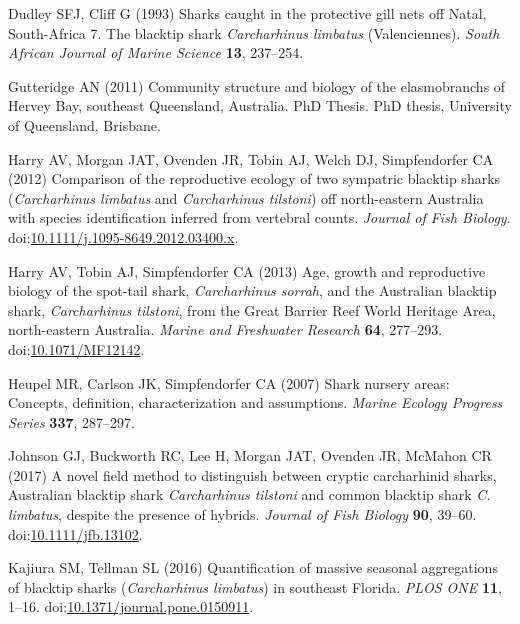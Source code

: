 \documentclass[]{article}
\begin{document}
\leavevmode\hypertarget{ref-dudley_sharks_1993}{}%
Dudley SFJ, Cliff G (1993) Sharks caught in the protective gill nets off
Natal, South-Africa 7. The blacktip shark \emph{Carcharhinus limbatus}
(Valenciennes). \emph{South African Journal of Marine Science}
\textbf{13}, 237--254.

\leavevmode\hypertarget{ref-gutteridge_community_2011}{}%
Gutteridge AN (2011) Community structure and biology of the
elasmobranchs of Hervey Bay, southeast Queensland, Australia. PhD
Thesis. PhD thesis, University of Queensland, Brisbane.

\leavevmode\hypertarget{ref-harry_comparison_2012}{}%
Harry AV, Morgan JAT, Ovenden JR, Tobin AJ, Welch DJ, Simpfendorfer CA
(2012) Comparison of the reproductive ecology of two sympatric blacktip
sharks (\emph{Carcharhinus limbatus} and \emph{Carcharhinus tilstoni})
off north-eastern Australia with species identification inferred from
vertebral counts. \emph{Journal of Fish Biology}.
doi:\href{https://doi.org/10.1111/j.1095-8649.2012.03400.x}{10.1111/j.1095-8649.2012.03400.x}.

\leavevmode\hypertarget{ref-harry_age_2013}{}%
Harry AV, Tobin AJ, Simpfendorfer CA (2013) Age, growth and reproductive
biology of the spot-tail shark, \emph{Carcharhinus sorrah}, and the
Australian blacktip shark, \emph{Carcharhinus tilstoni}, from the Great
Barrier Reef World Heritage Area, north-eastern Australia. \emph{Marine
and Freshwater Research} \textbf{64}, 277--293.
doi:\href{https://doi.org/10.1071/MF12142}{10.1071/MF12142}.

\leavevmode\hypertarget{ref-heupel_shark_2007}{}%
Heupel MR, Carlson JK, Simpfendorfer CA (2007) Shark nursery areas:
Concepts, definition, characterization and assumptions. \emph{Marine
Ecology Progress Series} \textbf{337}, 287--297.

\leavevmode\hypertarget{ref-johnson_novel_2017}{}%
Johnson GJ, Buckworth RC, Lee H, Morgan JAT, Ovenden JR, McMahon CR
(2017) A novel field method to distinguish between cryptic carcharhinid
sharks, Australian blacktip shark \emph{Carcharhinus tilstoni} and
common blacktip shark \emph{C. limbatus}, despite the presence of
hybrids. \emph{Journal of Fish Biology} \textbf{90}, 39--60.
doi:\href{https://doi.org/10.1111/jfb.13102}{10.1111/jfb.13102}.

\leavevmode\hypertarget{ref-kajiura_quantification_2016}{}%
Kajiura SM, Tellman SL (2016) Quantification of massive seasonal
aggregations of blacktip sharks (\emph{Carcharhinus limbatus}) in
southeast Florida. \emph{PLOS ONE} \textbf{11}, 1--16.
doi:\href{https://doi.org/10.1371/journal.pone.0150911}{10.1371/journal.pone.0150911}.
\end{document}
